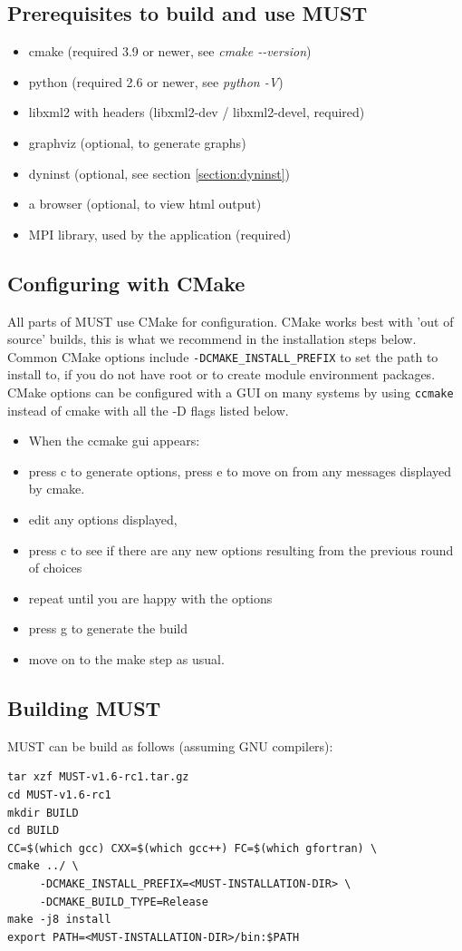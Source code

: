 \documentclass[english]{scrartcl}
\begin{document}
\subsection{Prerequisites to build and use MUST}
\begin{itemize}
 \item cmake (required 3.9 or newer, see \emph{cmake \mbox{-{}-version}})
 \item python (required 2.6 or newer, see \emph{python \mbox{-V}})
 \item libxml2 with headers (libxml2-dev / libxml2-devel, required)
 \item graphviz (optional, to generate graphs)
 \item dyninst (optional, see section \ref{section:dyninst})
 \item a browser (optional, to view html output)
 \item MPI library, used by the application (required)
\end{itemize}
\subsection{Configuring with CMake}
All parts of MUST use CMake for configuration.
CMake works best with 'out of source' builds, this is what we recommend in
the installation steps below. 
Common CMake options include \verb|-DCMAKE_INSTALL_PREFIX| to set the path to
install to, if you do not have root or to create module environment packages.
CMake options can be configured with a GUI on many systems by using
\verb|ccmake| instead of cmake with all the -D flags listed below.
\begin{itemize}
     \item When the ccmake gui appears:
     \item press c to generate options, press e to move on from any messages displayed by cmake. 
     \item edit any options displayed, 
     \item press c to see if there are any new options resulting from the previous round of choices
     \item repeat until you are happy with the options
     \item press g to generate the build
     \item  move on to the make step as usual.
\end{itemize}
\subsection{Building MUST}
MUST can be build as follows (assuming GNU compilers):
\begin{verbatim}
tar xzf MUST-v1.6-rc1.tar.gz
cd MUST-v1.6-rc1
mkdir BUILD
cd BUILD
CC=$(which gcc) CXX=$(which gcc++) FC=$(which gfortran) \
cmake ../ \
     -DCMAKE_INSTALL_PREFIX=<MUST-INSTALLATION-DIR> \
     -DCMAKE_BUILD_TYPE=Release
make -j8 install
export PATH=<MUST-INSTALLATION-DIR>/bin:$PATH
\end{verbatim}
\end{document}
